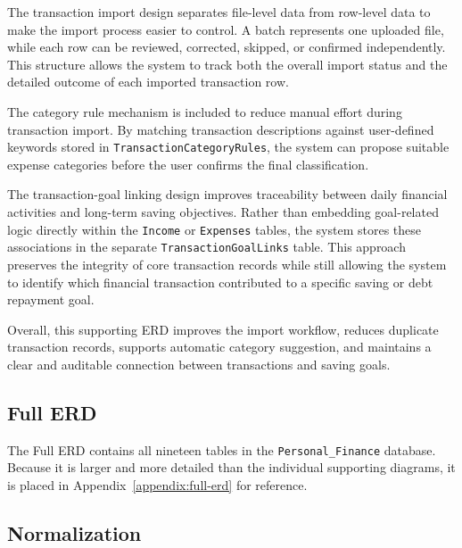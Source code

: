 \documentclass{article}
\begin{document}
The transaction import design separates file-level data from row-level data to make the import
process easier to control. A batch represents one uploaded file, while each row can be reviewed,
corrected, skipped, or confirmed independently. This structure allows the system to track both the
overall import status and the detailed outcome of each imported transaction row.

The category rule mechanism is included to reduce manual effort during transaction import. By
matching transaction descriptions against user-defined keywords stored in
\texttt{TransactionCategoryRules}, the system can propose suitable expense categories before the
user confirms the final classification.

The transaction-goal linking design improves traceability between daily financial activities and
long-term saving objectives. Rather than embedding goal-related logic directly within the
\texttt{Income} or \texttt{Expenses} tables, the system stores these associations in the separate
\texttt{TransactionGoalLinks} table. This approach preserves the integrity of core transaction
records while still allowing the system to identify which financial transaction contributed to a
specific saving or debt repayment goal.

Overall, this supporting ERD improves the import workflow, reduces duplicate transaction records,
supports automatic category suggestion, and maintains a clear and auditable connection between
transactions and saving goals.

\subsection{Full ERD}

The Full ERD contains all nineteen tables in the \texttt{Personal\_Finance} database. Because it
is larger and more detailed than the individual supporting diagrams, it is placed in
Appendix~\ref{appendix:full-erd} for reference.

\subsection{Normalization}
\end{document}
